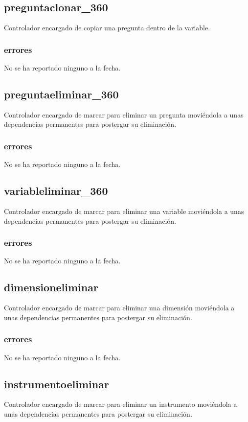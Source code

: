 \documentclass[10pt,a4paper]{book}
\begin{document}
	\subsection{preguntaclonar\_360}
	Controlador encargado de copiar una pregunta dentro de la variable.
	\subsubsection{errores}
	No se ha reportado ninguno a la fecha.

	\subsection{preguntaeliminar\_360}
	Controlador encargado de marcar para eliminar un pregunta moviéndola a unas dependencias permanentes para postergar su eliminación.
	\subsubsection{errores}
	No se ha reportado ninguno a la fecha.

	\subsection{variableliminar\_360}
	Controlador encargado de marcar para eliminar una variable moviéndola a unas dependencias permanentes para postergar su eliminación.
	\subsubsection{errores}
	No se ha reportado ninguno a la fecha.

	\subsection{dimensioneliminar}
	Controlador encargado de marcar para eliminar una dimensión moviéndola a unas dependencias permanentes para postergar su eliminación.
	\subsubsection{errores}
	No se ha reportado ninguno a la fecha.

	\subsection{instrumentoeliminar}
	Controlador encargado de marcar para eliminar un instrumento moviéndola a unas dependencias permanentes para postergar su eliminación.
\end{document}

